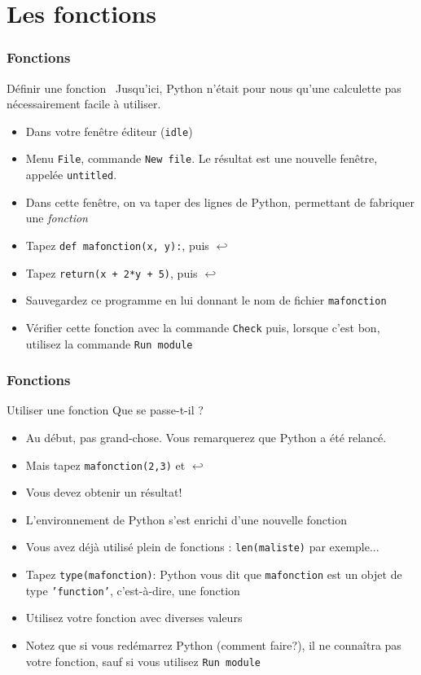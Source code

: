 \documentclass{beamer}
\newcommand{\mypause}{~}
\newcommand{\alalign}{{$\hookleftarrow$}}
\newcommand{\pyth}{{\sc Python}}
\newcommand{\prog}[1]{\alert{\texttt{#1}}}
\begin{document}
\section{Les fonctions}
\frame
{
\frametitle{Fonctions}
{\footnotesize
\begin{block}{Définir une fonction}\mypause{}
Jusqu'ici, \pyth{} n'était pour nous qu'une calculette
pas nécessairement facile à utiliser. \mypause{}
\begin{itemize}
\item Dans votre fenêtre éditeur (\prog{idle})\mypause{}
\item Menu \prog{File}, commande \prog{New file}.
Le résultat est une nouvelle fenêtre, appelée \prog{untitled}.\mypause{}
\item Dans cette fenêtre, on va taper des lignes de \pyth{}, permettant de fabriquer une
\alert{\em fonction}\mypause{}
\item Tapez \prog{def mafonction(x, y):}, puis \alalign{}\mypause{}
\item Tapez \prog{return(x + 2*y + 5)}, puis \alalign{}\mypause{}
\item \alert{Sauvegardez} ce programme en lui donnant le nom de fichier \prog{mafonction}\mypause{}
\item Vérifier cette fonction avec la commande \texttt{Check} puis, lorsque c'est bon,
utilisez la commande \texttt{Run module}
\end{itemize}
\end{block}
}
}

\frame
{
\frametitle{Fonctions}
{\footnotesize
\begin{block}{Utiliser une fonction}
Que se passe-t-il ?\mypause{}
\begin{itemize}
\item Au début, pas grand-chose. Vous remarquerez que \pyth{} a été relancé.\mypause{}
\item Mais tapez \prog{mafonction(2,3)} et \alalign{}\mypause{}
\item Vous devez obtenir un résultat!\mypause{}
\item L'\alert{environnement} de \pyth{} s'est enrichi d'une nouvelle fonction\mypause{}
\item Vous avez déjà utilisé plein de fonctions : \prog{len(maliste)} par exemple...
\item Tapez \prog{type(mafonction)}: \pyth{} vous dit que \prog{mafonction}
est un objet de type \prog{'function'}, c'est-à-dire, une fonction\mypause{}
\item Utilisez votre fonction avec diverses valeurs\mypause{}
\item Notez que si vous redémarrez \pyth{} (comment faire?), il ne connaîtra pas
votre fonction, sauf si vous utilisez \prog{Run module}\mypause{}
\end{itemize}
\end{block}
}
}
\end{document}
